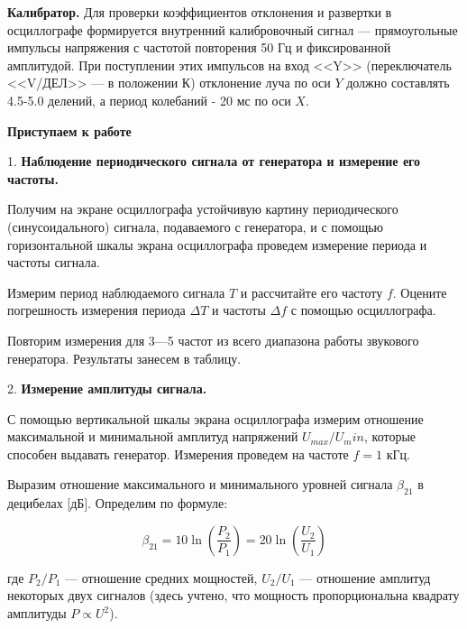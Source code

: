 \documentclass[14pt]{article}
\begin{document}
%
%

\vspace{0.5cm}
\textbf{Калибратор.} Для проверки коэффициентов отклонения и развертки в осциллографе формируется внутренний калибровочный сигнал --- прямоугольные импульсы напряжения с частотой повторения 50 Гц и фиксированной амплитудой. При поступлении этих импульсов на вход <<Y>> (переключатель <<V/ДЕЛ>> --- в положении К) отклонение луча по оси $Y$ должно составлять 4.5-5.0 делений, а период колебаний - 20 мс по оси $X$.

%
%

\vspace{1cm}
\textbf{Приступаем к работе}

\vspace{0.5cm}
1. \textbf{Наблюдение периодического сигнала от генератора и измерение его частоты.} 

Получим на экране осциллографа устойчивую картину периодического (синусоидального) сигнала, подаваемого с генератора, и с помощью горизонтальной шкалы экрана осциллографа проведем измерение периода и частоты сигнала.

Измерим период наблюдаемого сигнала $T$ и рассчитайте его частоту $f$. Оцените погрешность измерения периода $\Delta T$ и частоты $\Delta f$ с помощью осциллографа.

Повторим измерения для 3—5 частот из всего диапазона работы звукового генератора. Результаты занесем в таблицу.

%
%

\vspace{0.5cm}
2. \textbf{Измерение амплитуды сигнала.} 

С помощью вертикальной шкалы экрана осциллографа измерим отношение максимальной и минимальной амплитуд напряжений $U_{max}/U_min$, которые способен выдавать генератор. Измерения проведем на частоте $f = 1$ кГц.

Выразим отношение максимального и минимального уровней сигнала $\beta_{21}$ в децибелах [дБ]. Определим по формуле:

$$\beta_{21} = 10 \ln\left(\frac{P_2}{P_1}\right) = 20 \ln\left(\frac{U_2}{U_1}\right)$$

где $P_2/P_1$ — отношение средних мощностей, $U_2/U_1$ — отношение амплитуд некоторых двух сигналов (здесь учтено, что мощность пропорциональна квадрату амплитуды $P \propto U^2$).
\end{document}
